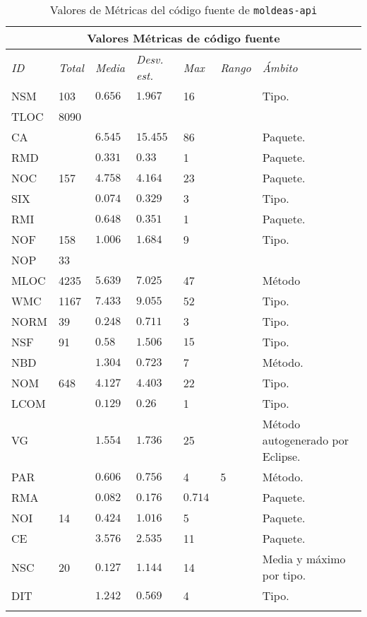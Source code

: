         
   \begin{longtable}{|p{2cm}|p{1.5cm}|p{1.5cm}|p{1.5cm}|p{1cm}|p{2cm}|p{4cm}|}

      \hline 
	    \multicolumn{7}{|c|}{\textbf{Valores Métricas de código fuente}}\\ \hline
	    \textit{ID} &  \textit{Total} &  \textit{Media}&  \textit{Desv. est.} & \textit{Max}& \textit{Rango}& \textit{Ámbito} \\ \hline
      \endhead
		NSM&103&$0.656$&$1.967$&16& \na &Tipo. \\ \hline
		TLOC&8090&\na&\na&\na&\na&\na \\ \hline
		CA&\na&$6.545$&$15.455$&86&\na&Paquete.\\ \hline
		RMD&\na&$0.331$&$0.33$&1&\na&Paquete. \\ \hline
		NOC&157&$4.758$&$4.164$&23&\na&Paquete. \\ \hline 
		SIX&\na&$0.074$&$0.329$&3&\na&Tipo. \\		\hline 
		RMI&\na&$0.648$&$0.351$&1&\na&Paquete. \\ \hline
		NOF&158&$1.006$&$1.684$&9&\na&Tipo. \\ \hline
		NOP&33&\na&\na&\na&\na&\na \\ \hline
		MLOC&4235&$5.639$&$7.025$&47&\na&Método \\ \hline
		WMC&1167&$7.433$&$9.055$&52&\na&Tipo. \\ \hline
		NORM&39&$0.248$&$0.711$&3&\na&Tipo. \\ \hline
		NSF&91&$0.58$&$1.506$&$15$&\na&Tipo. \\ \hline
		NBD&\na&$1.304$&$0.723$&7&\na&Método. \\ \hline
		NOM&648&$4.127$&$4.403$&22&\na&Tipo. \\		\hline 
		LCOM&\na&$0.129$&$0.26$&1&\na&Tipo. \\ \hline 
		VG&\na&$1.554$&$1.736$&25&\na&Método autogenerado por Eclipse. \\ \hline
		PAR&\na&$0.606$&$0.756$&4&5&Método.\\ \hline 
		RMA&\na&$0.082$&$0.176$&$0.714$&\na&Paquete. \\ \hline
		NOI&14&$0.424$&$1.016$&5&\na&Paquete. \\ \hline
		CE&\na&$3.576$&$2.535$&11&\na&Paquete. \\ \hline
		NSC&20&$0.127$&$1.144$&14&\na&Media y máximo por tipo. \\ \hline
		DIT&\na&$1.242$&$0.569$&4&\na&Tipo. \\ \hline
    	 \hline
        \caption{Valores de Métricas del código fuente de \texttt{moldeas-api}} \label{tabla:metricas-valores}\\
        \end{longtable}    
  
